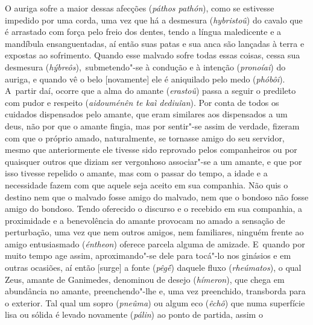 \bekker{[254e]} O auriga sofre a maior dessas afecções (\emph{páthos
pathón}), como se estivesse impedido por uma corda, uma vez que há a
desmesura (\emph{hybristoû}) do cavalo que é arrastado com força pelo
freio dos dentes, tendo a língua maledicente e a mandíbula
ensanguentadas, aí então suas patas e sua anca são lançadas à terra e
expostas ao sofrimento. Quando esse malvado sofre todas essas coisas,
cessa sua desmesura (\emph{hýbreôs}),~submetendo"-se à condução e à
intenção (\emph{pronoíai}) do auriga, e quando vê o belo [novamente]
ele é aniquilado pelo medo (\emph{phóbôi}). A~partir daí, ocorre que a
alma do amante (\emph{erastoû}) passa a seguir o predileto com pudor e
respeito (\emph{aidouménên te kaì dediuîan}). \bekker{[255a]} Por conta de
todos os cuidados dispensados pelo amante, que eram similares aos
dispensados a um deus, não por que o amante fingia, mas por sentir"-se
assim de verdade, fizeram com que o próprio amado, naturalmente, se
tornasse amigo do seu servidor, mesmo que anteriormente ele tivesse sido
reprovado pelos companheiros ou por quaisquer outros que diziam ser
vergonhoso associar"-se a um amante, e que por isso tivesse repelido o
amante, mas com o passar do tempo, \bekker{[255b]} a idade e a necessidade
fazem com que aquele seja aceito em sua companhia. Não quis o destino
nem que o malvado fosse amigo do malvado, nem que o bondoso não fosse
amigo do bondoso. Tendo oferecido o discurso e o recebido em sua
companhia, a proximidade e a benevolência do amante provocam no amado a
sensação de perturbação, uma vez que nem outros amigos, nem familiares,
ninguém frente ao amigo entusiasmado (\emph{éntheon}) oferece parcela
alguma de amizade. E~quando por muito tempo age assim, aproximando"-se
dele para tocá"-lo nos ginásios e em outras ocasiões, \bekker{[255c]} aí então
[surge] a fonte (\emph{pêgḗ}) daquele fluxo (\emph{rheúmatos}), o
qual Zeus, amante de Ganimedes, denominou de desejo (\emph{hímeron}),
que chega em abundância no amante, preenchendo"-lhe e, uma vez
preenchido, transborda para o exterior. Tal qual um sopro
(\emph{pneûma}) ou algum eco (\emph{êchô}) que numa superfície lisa ou
sólida é levado novamente (\emph{pálin}) ao ponto de partida, assim o
